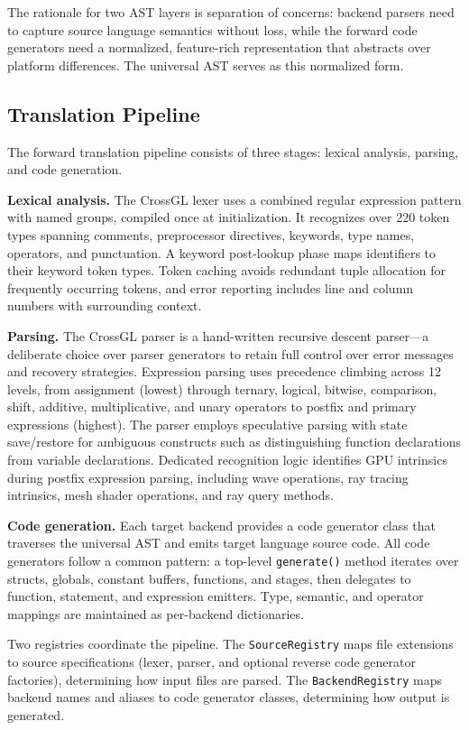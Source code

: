 \documentclass{svproc}
\begin{document}
The rationale for two AST layers is separation of concerns: backend parsers need to capture source language semantics without loss, while the forward code generators need a normalized, feature-rich representation that abstracts over platform differences. The universal AST serves as this normalized form.

\subsection{Translation Pipeline}

The forward translation pipeline consists of three stages: lexical analysis, parsing, and code generation.

\textbf{Lexical analysis.} The CrossGL lexer uses a combined regular expression pattern with named groups, compiled once at initialization. It recognizes over 220 token types spanning comments, preprocessor directives, keywords, type names, operators, and punctuation. A keyword post-lookup phase maps identifiers to their keyword token types. Token caching avoids redundant tuple allocation for frequently occurring tokens, and error reporting includes line and column numbers with surrounding context.

\textbf{Parsing.} The CrossGL parser is a hand-written recursive descent parser---a deliberate choice over parser generators to retain full control over error messages and recovery strategies. Expression parsing uses precedence climbing across 12 levels, from assignment (lowest) through ternary, logical, bitwise, comparison, shift, additive, multiplicative, and unary operators to postfix and primary expressions (highest). The parser employs speculative parsing with state save/restore for ambiguous constructs such as distinguishing function declarations from variable declarations. Dedicated recognition logic identifies GPU intrinsics during postfix expression parsing, including wave operations, ray tracing intrinsics, mesh shader operations, and ray query methods.

\textbf{Code generation.} Each target backend provides a code generator class that traverses the universal AST and emits target language source code. All code generators follow a common pattern: a top-level \texttt{generate()} method iterates over structs, globals, constant buffers, functions, and stages, then delegates to function, statement, and expression emitters. Type, semantic, and operator mappings are maintained as per-backend dictionaries.

Two registries coordinate the pipeline. The \texttt{SourceRegistry} maps file extensions to source specifications (lexer, parser, and optional reverse code generator factories), determining how input files are parsed. The \texttt{BackendRegistry} maps backend names and aliases to code generator classes, determining how output is generated.
\end{document}
